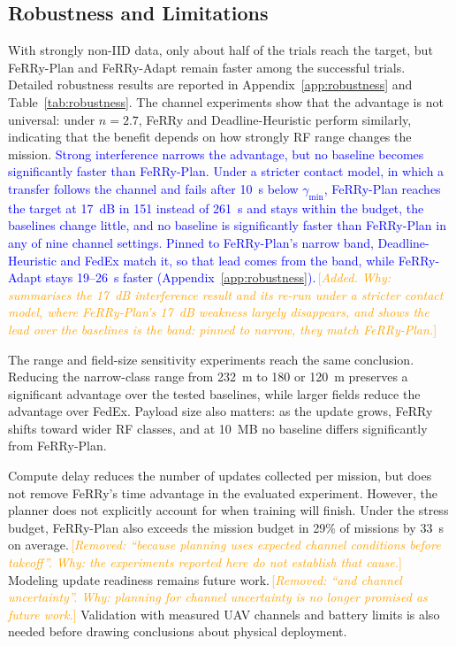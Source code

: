 \documentclass[conference]{IEEEtran}
\newcommand{\sysname}{FeRRy}
\newcommand{\changenote}[1]{\textcolor{orange}{\,[\emph{#1}]}}
\begin{document}
\subsection{Robustness and Limitations}
\label{sec:robustness}
With strongly non-IID data, only about half of the trials reach the target, but
\sysname{}-Plan and \sysname{}-Adapt remain faster among the successful trials. Detailed robustness results are reported in
Appendix~\ref{app:robustness} and Table~\ref{tab:robustness}.
The channel experiments show that the advantage is not universal: under
\(n=2.7\), \sysname{} and Deadline-Heuristic perform similarly, indicating
that the benefit depends on how strongly RF range changes the mission.
\textcolor{blue}{Strong interference narrows the advantage, but no baseline becomes
significantly faster than \sysname{}-Plan. Under a stricter contact model, in
which a transfer follows the channel and fails after 10~s below
$\gamma_{\min}$, \sysname{}-Plan reaches the target at 17~dB in 151 instead of
261~s and stays within the budget, the baselines change little, and no baseline
is significantly faster than \sysname{}-Plan in any of nine channel settings.
Pinned to \sysname{}-Plan's narrow band, Deadline-Heuristic and FedEx match it,
so that lead comes from the band, while \sysname{}-Adapt stays 19--26~s faster
(Appendix~\ref{app:robustness}).}\changenote{Added. Why: summarises the 17~dB interference result and its re-run under a stricter contact model, where \sysname{}-Plan's 17~dB weakness largely disappears, and shows the lead over the baselines is the band: pinned to narrow, they match \sysname{}-Plan.}

The range and field-size sensitivity experiments reach the same conclusion.
Reducing the narrow-class range from 232~m to 180 or 120~m preserves a
significant advantage over the tested baselines, while larger fields reduce the
advantage over FedEx. Payload size also matters: as the update grows,
\sysname{} shifts toward wider RF classes, and at 10~MB no baseline differs
significantly from \sysname{}-Plan.

Compute delay reduces the number of updates collected per mission, but does not
remove \sysname{}'s time advantage in the evaluated experiment. However, the
planner does not explicitly account for when training will finish. Under the
stress budget, \sysname{}-Plan also exceeds the mission budget in 29\% of
missions by 33~s on average.\changenote{Removed: ``because planning uses expected channel conditions before takeoff''. Why: the experiments reported here do not establish that cause.} Modeling update readiness remains future work.\changenote{Removed: ``and channel uncertainty''. Why: planning for channel uncertainty is no longer promised as future work.} Validation with measured UAV channels and battery limits is also
needed before drawing conclusions about physical deployment.
\end{document}
